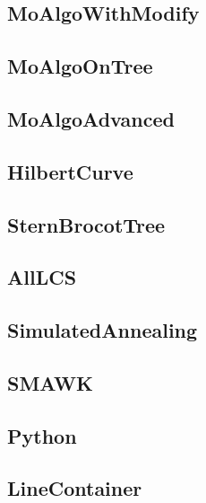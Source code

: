 	\subsection{MoAlgoWithModify}
	
	\subsection{MoAlgoOnTree}
	
	\subsection{MoAlgoAdvanced}
	
	\subsection{HilbertCurve}
	
	\subsection{SternBrocotTree}
	
	\subsection{AllLCS}
	
	\subsection{SimulatedAnnealing}
	
	\subsection{SMAWK}
	
	\subsection{Python}
	
	\subsection{LineContainer}
	
